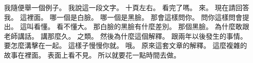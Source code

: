 \hypertarget{c01:cue:233}{}我隨便舉一個例子。
\hypertarget{c01:cue:234}{}我說這一段文字。
\hypertarget{c01:cue:235}{}十頁左右。
\hypertarget{c01:cue:236}{}看完了嗎。
\hypertarget{c01:cue:237}{}來。
\hypertarget{c01:cue:238}{}現在請回答我。
\hypertarget{c01:cue:239}{}這裡面。
\hypertarget{c01:cue:240}{}哪一個是白臉。
\hypertarget{c01:cue:241}{}哪一個是黑臉。
\hypertarget{c01:cue:242}{}那會這樣問你。
\hypertarget{c01:cue:243}{}問你這樣問會提出。
\hypertarget{c01:cue:244}{}這叫看懂。
\hypertarget{c01:cue:245}{}看不懂大。
\hypertarget{c01:cue:246}{}那白臉的黑臉有什麼差別。
\hypertarget{c01:cue:247}{}那個黑臉。
\hypertarget{c01:cue:248}{}為什麼敢跟老師講話。
\hypertarget{c01:cue:249}{}講那麼久。
\hypertarget{c01:cue:250}{}之類。
\hypertarget{c01:cue:251}{}然後為什麼這個解釋。
\hypertarget{c01:cue:252}{}跟兩年以後發生的事情。
\hypertarget{c01:cue:253}{}要怎麼溝擊在一起。
\hypertarget{c01:cue:254}{}這樣子慢慢你就。
\hypertarget{c01:cue:255}{}哦。
\hypertarget{c01:cue:256}{}原來這套文章的解釋。
\hypertarget{c01:cue:257}{}這麼複雜的故事在裡面。
\hypertarget{c01:cue:258}{}表面上看不見。
\hypertarget{c01:cue:259}{}所以就要花一點時間去做。

